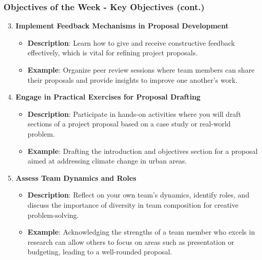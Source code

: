\documentclass[aspectratio=169]{beamer}
\begin{document}
\begin{frame}[fragile]
    \frametitle{Objectives of the Week - Key Objectives (cont.)}
    \begin{enumerate}\setcounter{enumi}{2}
        \item \textbf{Implement Feedback Mechanisms in Proposal Development}
        \begin{itemize}
            \item \textbf{Description}: Learn how to give and receive constructive feedback effectively, which is vital for refining project proposals.
            \item \textbf{Example}: Organize peer review sessions where team members can share their proposals and provide insights to improve one another’s work.
        \end{itemize}

        \item \textbf{Engage in Practical Exercises for Proposal Drafting}
        \begin{itemize}
            \item \textbf{Description}: Participate in hands-on activities where you will draft sections of a project proposal based on a case study or real-world problem.
            \item \textbf{Example}: Drafting the introduction and objectives section for a proposal aimed at addressing climate change in urban areas.
        \end{itemize}

        \item \textbf{Assess Team Dynamics and Roles}
        \begin{itemize}
            \item \textbf{Description}: Reflect on your own team’s dynamics, identify roles, and discuss the importance of diversity in team composition for creative problem-solving.
            \item \textbf{Example}: Acknowledging the strengths of a team member who excels in research can allow others to focus on areas such as presentation or budgeting, leading to a well-rounded proposal.
        \end{itemize}
    \end{enumerate}
\end{frame}
\end{document}
